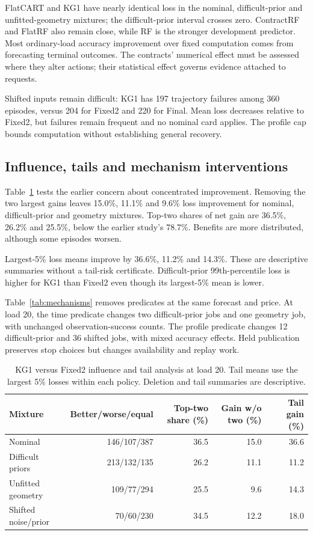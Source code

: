 FlatCART and KG1 have nearly identical loss in the nominal, difficult-prior and unfitted-geometry mixtures; the difficult-prior interval crosses zero. ContractRF and FlatRF also remain close, while RF is the stronger development predictor. Most ordinary-load accuracy improvement over fixed computation comes from forecasting terminal outcomes. The contracts' numerical effect must be assessed where they alter actions; their statistical effect governs evidence attached to requests.

Shifted inputs remain difficult: KG1 has 197 trajectory failures among 360 episodes, versus 204 for Fixed2 and 220 for Final. Mean loss decreases relative to Fixed2, but failures remain frequent and no nominal card applies. The profile cap bounds computation without establishing general recovery.

\subsection{Influence, tails and mechanism interventions}
Table~\ref{tab:influence} tests the earlier concern about concentrated improvement. Removing the two largest gains leaves 15.0\%, 11.1\% and 9.6\% loss improvement for nominal, difficult-prior and geometry mixtures. Top-two shares of net gain are 36.5\%, 26.2\% and 25.5\%, below the earlier study's 78.7\%. Benefits are more distributed, although some episodes worsen.

Largest-5\% loss means improve by 36.6\%, 11.2\% and 14.3\%. These are descriptive summaries without a tail-risk certificate. Difficult-prior 99th-percentile loss is higher for KG1 than Fixed2 even though its largest-5\% mean is lower.

Table~\ref{tab:mechanisms} removes predicates at the same forecast and price. At load 20, the time predicate changes two difficult-prior jobs and one geometry job, with unchanged observation-success counts. The profile predicate changes 12 difficult-prior and 36 shifted jobs, with mixed accuracy effects. Held publication preserves stop choices but changes availability and replay work.
\begin{table}[!htbp]\centering\footnotesize
\caption{KG1 versus Fixed2 influence and tail analysis at load 20. Tail means use the largest 5\% losses within each policy. Deletion and tail summaries are descriptive.}\label{tab:influence}
\begin{tabular}{@{}lrrrr@{}}\toprule
Mixture & Better/worse/equal & Top-two share (\%) & Gain w/o two (\%) & Tail gain (\%)\\\midrule
Nominal & 146/107/387 & 36.5 & 15.0 & 36.6\\
Difficult priors & 213/132/135 & 26.2 & 11.1 & 11.2\\
Unfitted geometry & 109/77/294 & 25.5 & 9.6 & 14.3\\
Shifted noise/prior & 70/60/230 & 34.5 & 12.2 & 18.0\\
\bottomrule\end{tabular}\end{table}

